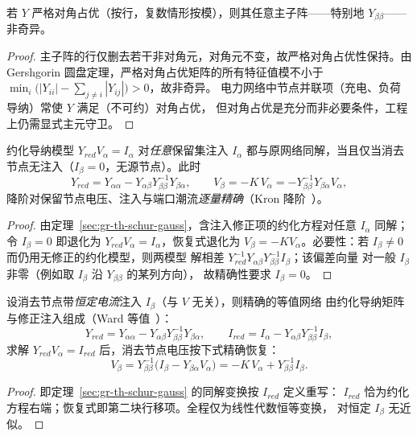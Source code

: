\begin{lemma}[消去块的非奇异充分条件]\label{sec:gr-th-ybb}
若 $Y$ 严格对角占优（按行，复数情形按模），则其任意主子阵——特别地
$Y_{\beta\beta}$——非奇异。
\end{lemma}
\begin{proof}
主子阵的行仅删去若干非对角元，对角元不变，故严格对角占优性保持。由 Gershgorin
圆盘定理，严格对角占优矩阵的所有特征值模不小于
$\min_i\bigl(|Y_{ii}|-\sum_{j\ne i}|Y_{ij}|\bigr)>0$，故非奇异。
电力网络中节点并联项（充电、负荷导纳）常使 $Y$ 满足（不可约）对角占优，
但对角占优是充分而非必要条件，工程上仍需显式主元守卫。
\end{proof}

\begin{theorem}\label{sec:gr-th-kron-exact}
约化导纳模型 $Y_{red}V_\alpha=I_\alpha$ 对\emph{任意}保留集注入 $I_\alpha$
都与原网络同解，当且仅当消去节点无注入（$I_\beta=0$，无源节点）。此时
\begin{equation}
Y_{red}=Y_{\alpha\alpha}-Y_{\alpha\beta}Y_{\beta\beta}^{-1}Y_{\beta\alpha},
\qquad
V_\beta=-K\,V_\alpha=-Y_{\beta\beta}^{-1}Y_{\beta\alpha}V_\alpha,
\end{equation}
降阶对保留节点电压、注入与端口潮流\emph{逐量精确}（Kron 降阶~\cite{grf:kron}）。
\end{theorem}
\begin{proof}
由定理~\ref{sec:gr-th-schur-gauss}，含注入修正项的约化方程对任意 $I_\alpha$
同解；令 $I_\beta=0$ 即退化为 $Y_{red}V_\alpha=I_\alpha$，恢复式退化为
$V_\beta=-KV_\alpha$。必要性：若 $I_\beta\ne0$ 而仍用无修正的约化模型，则两模型
解相差 $Y_{red}^{-1}Y_{\alpha\beta}Y_{\beta\beta}^{-1}I_\beta$；该偏差向量
对一般 $I_\beta$ 非零（例如取 $I_\beta$ 沿 $Y_{\beta\beta}$ 的某列方向），
故精确性要求 $I_\beta=0$。
\end{proof}

\begin{theorem}\label{sec:gr-th-ward}
设消去节点带\emph{恒定电流}注入 $I_\beta$（与 $V$ 无关），则精确的等值网络
由约化导纳矩阵与修正注入组成（Ward 等值~\cite{grf:ward}）：
\begin{equation}
Y_{red}=Y_{\alpha\alpha}-Y_{\alpha\beta}Y_{\beta\beta}^{-1}Y_{\beta\alpha},
\qquad
I_{red}=I_\alpha-Y_{\alpha\beta}Y_{\beta\beta}^{-1}I_\beta,
\end{equation}
求解 $Y_{red}V_\alpha=I_{red}$ 后，消去节点电压按下式精确恢复：
\begin{equation}
V_\beta=Y_{\beta\beta}^{-1}\bigl(I_\beta-Y_{\beta\alpha}V_\alpha\bigr)
=-K\,V_\alpha+Y_{\beta\beta}^{-1}I_\beta.
\end{equation}
\end{theorem}
\begin{proof}
即定理~\ref{sec:gr-th-schur-gauss} 的同解变换按 $I_{red}$ 定义重写：
$I_{red}$ 恰为约化方程右端；恢复式即第二块行移项。全程仅为线性代数恒等变换，
对恒定 $I_\beta$ 无近似。
\end{proof}

